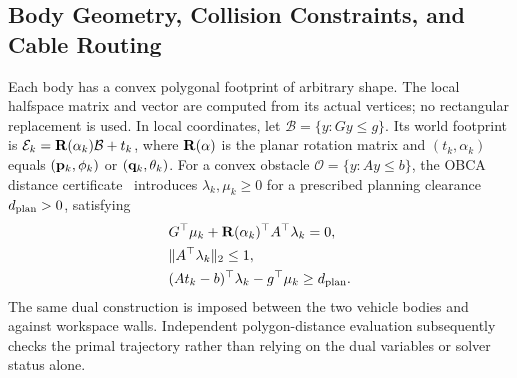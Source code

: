 \subsection{Body Geometry, Collision Constraints, and Cable Routing}
Each body has a convex polygonal footprint of arbitrary shape. The local halfspace matrix and vector are computed from its actual vertices; no rectangular replacement is used. In local coordinates, let $\mathcal B=\{y:Gy\leq g\}$. Its world footprint is $\mathcal E_k=\mathbf R(\alpha_k)\mathcal B+t_k$, where $\mathbf R(\alpha)$ is the planar rotation matrix and $(t_k,\alpha_k)$ equals $(\mathbf p_k,\phi_k)$ or $(\mathbf q_k,\theta_k)$. For a convex obstacle $\mathcal O=\{y:Ay\leq b\}$, the OBCA distance certificate~\cite{obca2021} introduces $\lambda_k,\mu_k\geq0$ for a prescribed planning clearance $d_{\rm plan}>0$, satisfying
\begin{equation}\begin{aligned}
 &G^\top\mu_k+\mathbf R(\alpha_k)^\top A^\top\lambda_k=0,\\
 &\|A^\top\lambda_k\|_2\leq1,\\
 &(At_k-b)^\top\lambda_k-g^\top\mu_k\geq d_{\rm plan}.
\end{aligned}\label{eq:obca}\end{equation}
The same dual construction is imposed between the two vehicle bodies and against workspace walls. Independent polygon-distance evaluation subsequently checks the primal trajectory rather than relying on the dual variables or solver status alone.

